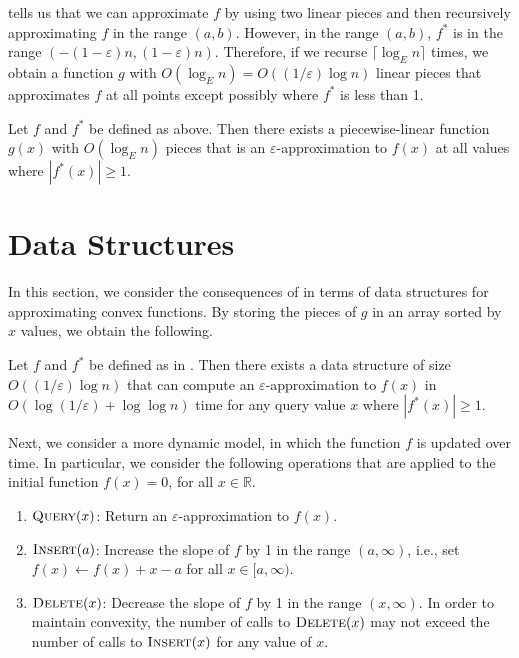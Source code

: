 \documentclass[charterfonts,lotsofwhite]{patmorin}
\newcommand{\eps}{\varepsilon}
\newcommand{\Real}{\mathbb{R}}
\begin{document}
 tells us that we can approximate $f$ by using two
linear pieces and then recursively approximating $f$ in the range
$(a,b)$.  However, in the range $(a,b)$, $f^*$ is in the range
$(-(1-\eps)n, (1-\eps)n)$.  Therefore, if we recurse $\lceil \log_E
n\rceil$ times, we obtain a function $g$ with $O(\log_E n) =
O((1/\eps) \log n)$ linear pieces that approximates $f$ at all points
except possibly where $f^*$ is less than 1.

\begin{thm}
Let $f$ and $f^*$ be defined as above.  Then there exists a piecewise-linear
function $g(x)$ with $O(\log_E n)$ pieces that is an
$\eps$-approximation to $f(x)$ at all values where $|f^*(x)|\ge 1$.
\end{thm}

\section{Data Structures}

In this section, we consider the consequences of  in
terms of data structures for approximating convex functions.  By
storing the pieces of $g$ in an array sorted by $x$ values, we obtain
the following.

\begin{thm}
Let $f$ and $f^*$ be defined as in .  Then there exists
a data structure of size $O((1/\eps) \log n)$ that can compute an
$\eps$-approximation to $f(x)$ in $O(\log (1/\eps) + \log \log n)$
time for any query value $x$ where $|f^*(x)|\ge 1$.
\end{thm}

Next, we consider a more dynamic model, in which the function $f$ is
updated over time.  In particular, we consider the following
operations that are applied to the initial function $f(x)=0$, for all
$x\in\Real$.

\begin{enumerate}
\item $\textsc{Query}(x)$: Return an $\eps$-approximation to
  $f(x)$.

\item $\textsc{Insert}(a)$: Increase the slope of $f$ by 1 in the
  range $(a,\infty)$, i.e., set $f(x)\gets f(x)+x-a$ for all $x\in
  [a,\infty)$.

\item $\textsc{Delete}(x)$: Decrease the slope of $f$ by 1 in the
  range $(x,\infty)$.  In order to maintain convexity, the number of
  calls to $\textsc{Delete}(x)$ may not exceed the number of calls to
  $\textsc{Insert}(x)$ for any value of $x$.
\end{enumerate}
\end{document}

